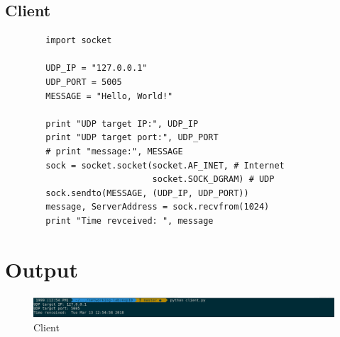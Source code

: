 \documentclass[a4paper,12pt]{article}
\begin{document}
    \subsection{Client}
    \begin{verbatim}
        import socket

        UDP_IP = "127.0.0.1"
        UDP_PORT = 5005
        MESSAGE = "Hello, World!"
        
        print "UDP target IP:", UDP_IP
        print "UDP target port:", UDP_PORT
        # print "message:", MESSAGE
        sock = socket.socket(socket.AF_INET, # Internet
                             socket.SOCK_DGRAM) # UDP
        sock.sendto(MESSAGE, (UDP_IP, UDP_PORT))
        message, ServerAddress = sock.recvfrom(1024)
        print "Time revceived: ", message        
    \end{verbatim}

    \section{Output}
    \pagebreak

    \begin{figure}
        \includegraphics[width=\linewidth]{./timeserver.png}
        \caption{Client}
        \label{fig:client}
    \end{figure}

    
    
    
\end{document}
